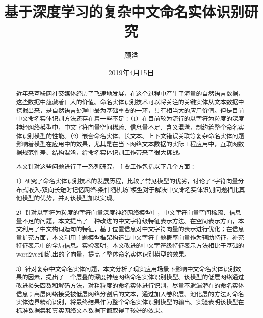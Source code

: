 \documentclass[winfonts,master,oneside,nobackinfo]{njuthesis}
\title{基于深度学习的复杂中文命名实体识别研究}
\author{顾溢}
\institute{南京大学}
\date{2019年4月15日}
\begin{document}

\maketitle
\makeenglishtitle



\begin{abstract}

近年来互联网社交媒体经历了飞速地发展，在这个过程中产生了海量的自然语言数据，这些数据中蕴藏着巨大的价值。命名实体识别技术可以将关注的关键实体从文本数据中挖掘出来，是自然语言处理中最为基础重要的一环，具有相当大的应用价值。但是目前中文命名实体识别方法还存在着一些不足：（1）在目前较为流行的以字符为粒度的深度神经网络模型中，中文字符向量空间稀疏、信息量不足、含义混淆，制约着整个命名实体识别模型的性能。（2）嵌套命名实体、长文本、上下文错误关联等复杂命名实体问题影响着模型在应用中的效果，尤其是在当下网络文本数据的实际工程应用中，互联网数据规范性差、结构混淆，给命名实体识别工作带来了很大挑战。

本文针对这些问题进行了一系列研究，主要工作包括以下几个方面：

1）研究了命名实体识别技术的发展历程，比较了常见模型的优劣，讨论了“字符向量分布式嵌入-双向长短时记忆网络-条件随机场”模型对于解决中文命名实体识别问题相比其他模型的优势，并对该模型加以实现。

2）针对以字符为粒度的字符向量深度神经网络模型中，中文字符向量空间稀疏、信息量不足的问题，本文提出了一种改进的中文字符级特征表示方法。在空间表示方面，本文利用了中文构词造句的特征，基于位置信息对中文字符向量的表示进行优化；在信息量扩充方面，本文利用主题模型框架构造出中文字符主题概率向量作为辅助特征，补充特征表示中的全局信息。实验表明，本文改进的中文字符级特征表示方法相比于基础的word2vec训练出的字向量，提高了整体命名实体识别模型的效果。

3）针对复杂中文命名实体问题，本文分析了现实应用场景下影响中文命名实体识别效果的因素，提出了一个层叠的深度神经网络命名实体识别模型。该模型的低层网络通过改进损失函数和解码方法，对粗粒度的命名实体进行识别，尽量不遗漏潜在的命名实体信息；高层网络接受被低层网络分割后的文本，通过加入卷积层、池化层的方法对命名实体边界精确识别，将最终结果作为整个命名实体识别模型的输出。实验表明该模型在标准数据集和真实网络文本数据下都取得了较好的效果。


\end{abstract}
\end{document}
